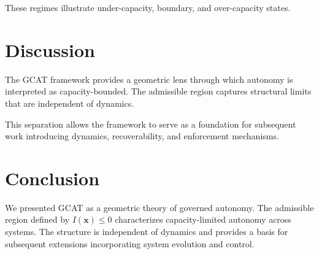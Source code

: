 \documentclass[letterpaper, 10 pt, conference]{ieeeconf}
\begin{document}
These regimes illustrate under-capacity, boundary, and over-capacity states.

\section{Discussion}

The GCAT framework provides a geometric lens through which autonomy is interpreted as capacity-bounded. The admissible region captures structural limits that are independent of dynamics.

This separation allows the framework to serve as a foundation for subsequent work introducing dynamics, recoverability, and enforcement mechanisms.

\section{Conclusion}

We presented GCAT as a geometric theory of governed autonomy. The admissible region defined by $I(\mathbf{x}) \le 0$ characterizes capacity-limited autonomy across systems. The structure is independent of dynamics and provides a basis for subsequent extensions incorporating system evolution and control.
\end{document}
